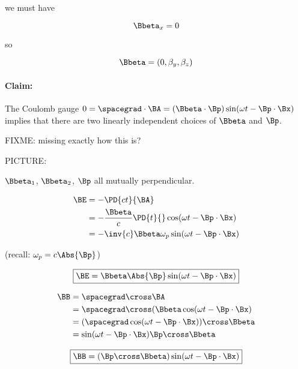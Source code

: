 we must have

\begin{equation}\label{eqn:relativisticElectrodynamicsL16:210}
\Bbeta_x = 0
\end{equation}

so

\begin{equation}\label{eqn:relativisticElectrodynamicsL16:230}
\Bbeta = (0, \beta_y, \beta_z)
\end{equation}

\paragraph{Claim:} The Coulomb gauge $0 = \spacegrad \cdot \BA = (\Bbeta \cdot \Bp)\sin(\omega t - \Bp \cdot \Bx)$ implies that there are two linearly independent choices of $\Bbeta$ and $\Bp$.

FIXME: missing exactly how this is?

PICTURE:

$\Bbeta_1$, $\Bbeta_2$, $\Bp$ all mutually perpendicular.

\begin{align*}
\BE
&= -\PD{ct}{\BA}  \\
&= -\frac{\Bbeta}{c} \PD{t}{} \cos(\omega t - \Bp \cdot \Bx) \\
&= -\inv{c} \Bbeta \omega_p
\sin(\omega t - \Bp \cdot \Bx)
\end{align*}

(recall: $\omega_p = c\Abs{\Bp}$)

\begin{equation}\label{eqn:relativisticElectrodynamicsL16:250}
\boxed{
\BE = \Bbeta \Abs{\Bp} \sin(\omega t - \Bp \cdot \Bx)
}
\end{equation}

\begin{align*}
\BB
&= \spacegrad \cross \BA \\
&= \spacegrad \cross ( \Bbeta \cos(\omega t - \Bp \cdot \Bx) \\
&= (\spacegrad \cos(\omega t - \Bp \cdot \Bx)) \cross \Bbeta \\
&= \sin(\omega t - \Bp \cdot \Bx) \Bp \cross \Bbeta
\end{align*}

\begin{equation}\label{eqn:relativisticElectrodynamicsL16:270}
\boxed{
\BB = (\Bp \cross \Bbeta) \sin(\omega t - \Bp \cdot \Bx)
}
\end{equation}

